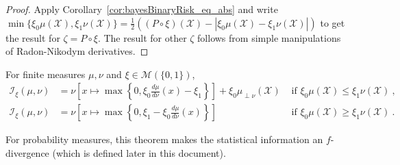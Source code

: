 \begin{proof}%
{}
Apply Corollary~\ref{cor:bayesBinaryRisk_eq_abs} and write $\min\{\xi_0\mu(\mathcal X), \xi_1\nu(\mathcal X)\} = \frac{1}{2}\left((P \circ \xi)(\mathcal X) - \left\vert \xi_0\mu(\mathcal X) - \xi_1\nu(\mathcal X) \right\vert \right)$ to get the result for $\zeta = P \circ \xi$.
The result for other $\zeta$ follows from simple manipulations of Radon-Nikodym derivatives.
\end{proof}


\begin{theorem}
  \label{thm:statInfo_eq_integral}
  For finite measures $\mu, \nu$ and $\xi \in \mathcal M(\{0,1\})$,
  \begin{align*}
  \mathcal I_\xi(\mu, \nu)
  &= \nu\left[ x \mapsto \max \left\{0 , \xi_0\frac{d \mu}{d\nu}(x) - \xi_1 \right\} \right] + \xi_0 \mu_{\perp \nu}(\mathcal X) & \text{ if } \xi_0 \mu(\mathcal X) \le \xi_1 \nu(\mathcal X)
  \: , \\
  \mathcal I_\xi(\mu, \nu)
  &= \nu\left[ x \mapsto \max \left\{0 , \xi_1 - \xi_0\frac{d \mu}{d\nu}(x) \right\} \right] & \text{ if } \xi_0 \mu(\mathcal X) \ge \xi_1 \nu(\mathcal X)
  \: .
  \end{align*}
  
\end{theorem}

For probability measures, this theorem makes the statistical information an $f$-divergence (which is defined later in this document).

